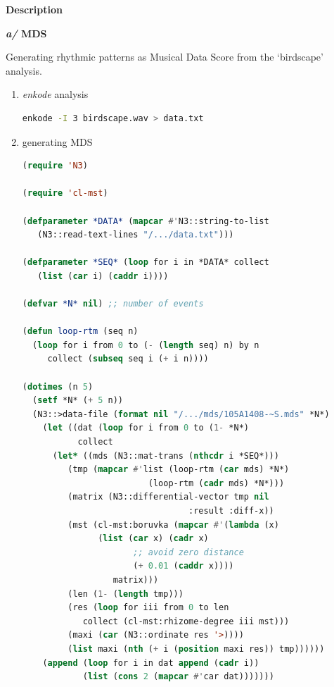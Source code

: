 \noindent \textbf{{\large Description}}
\hrulefill

\bigskip

  \textbf{\textit{a/} MDS }
  
  \smallskip
  Generating rhythmic patterns as Musical Data Score from the `birdscape' analysis.
  
 \begin{enumerate}
\item \textsl{enkode} analysis
 
\begin{lstlisting}[basicstyle=\footnotesize\ttfamily,language=Bash]
enkode -I 3 birdscape.wav > data.txt
\end{lstlisting}

\item generating MDS
\begin{lstlisting}[basicstyle=\footnotesize\ttfamily,language=Lisp]
(require 'N3)

(require 'cl-mst)

(defparameter *DATA* (mapcar #'N3::string-to-list 
   (N3::read-text-lines "/.../data.txt")))

(defparameter *SEQ* (loop for i in *DATA* collect 
   (list (car i) (caddr i))))

(defvar *N* nil) ;; number of events

(defun loop-rtm (seq n)
  (loop for i from 0 to (- (length seq) n) by n 
     collect (subseq seq i (+ i n))))

(dotimes (n 5)
  (setf *N* (+ 5 n))
  (N3::>data-file (format nil "/.../mds/105A1408-~S.mds" *N*) 
    (let ((dat (loop for i from 0 to (1- *N*) 
           collect
	  (let* ((mds (N3::mat-trans (nthcdr i *SEQ*)))
		 (tmp (mapcar #'list (loop-rtm (car mds) *N*) 
			             (loop-rtm (cadr mds) *N*)))
		 (matrix (N3::differential-vector tmp nil 
		                         :result :diff-x))
		 (mst (cl-mst:boruvka (mapcar #'(lambda (x) 
		       (list (car x) (cadr x) 
		              ;; avoid zero distance
		              (+ 0.01 (caddr x)))) 
		          matrix)))
		 (len (1- (length tmp)))
		 (res (loop for iii from 0 to len 
			collect (cl-mst:rhizome-degree iii mst)))
		 (maxi (car (N3::ordinate res '>))))
	     (list maxi (nth (+ i (position maxi res)) tmp))))))
	(append (loop for i in dat append (cadr i)) 
	        (list (cons 2 (mapcar #'car dat)))))))
\end{lstlisting}
\end{enumerate}

